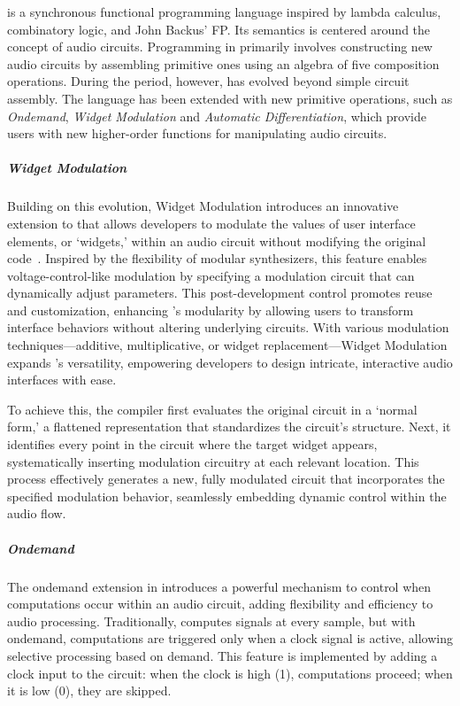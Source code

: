 \F{} is a synchronous functional programming language inspired by lambda calculus, combinatory logic, and John Backus'
FP. Its semantics is centered around the concept of audio circuits. Programming in \F{} primarily involves constructing
new audio circuits by assembling primitive ones using an algebra of five composition operations. During the period,
however, \F{} has evolved beyond simple circuit assembly. The language has been extended with new primitive operations,
such as \emph{Ondemand}, \emph{Widget Modulation} and \emph{Automatic Differentiation}, which provide users with new
higher-order functions for manipulating audio circuits.


\subparagraph{Widget Modulation}

Building on this evolution, Widget Modulation introduces an innovative extension to \F{} that allows developers to
modulate the values of user interface elements, or `widgets,' within an audio circuit without modifying the original
code~\cite{orlarey:hal-04762253}. Inspired by the flexibility of modular synthesizers, this feature enables
voltage-control-like modulation by specifying a modulation circuit that can dynamically adjust parameters. This
post-development control promotes reuse and customization, enhancing \F{}'s modularity by allowing users to transform
interface behaviors without altering underlying circuits. With various modulation techniques---additive, multiplicative,
or widget replacement---Widget Modulation expands \F{}'s versatility, empowering developers to design intricate,
interactive audio interfaces with ease.

To achieve this, the \F{} compiler first evaluates the original circuit in a `normal form,' a flattened representation
that standardizes the circuit's structure. Next, it identifies every point in the circuit where the target widget
appears, systematically inserting modulation circuitry at each relevant location. This process effectively generates a
new, fully modulated circuit that incorporates the specified modulation behavior, seamlessly embedding dynamic control
within the audio flow.

\subparagraph{Ondemand}

The ondemand extension in \F{} introduces a powerful mechanism to control when computations occur within an audio
circuit, adding flexibility and efficiency to audio processing. Traditionally, \F{} computes signals at every sample,
but with ondemand, computations are triggered only when a clock signal is active, allowing selective processing based on
demand. This feature is implemented by adding a clock input to the circuit: when the clock is high (1), computations
proceed; when it is low (0), they are skipped.

